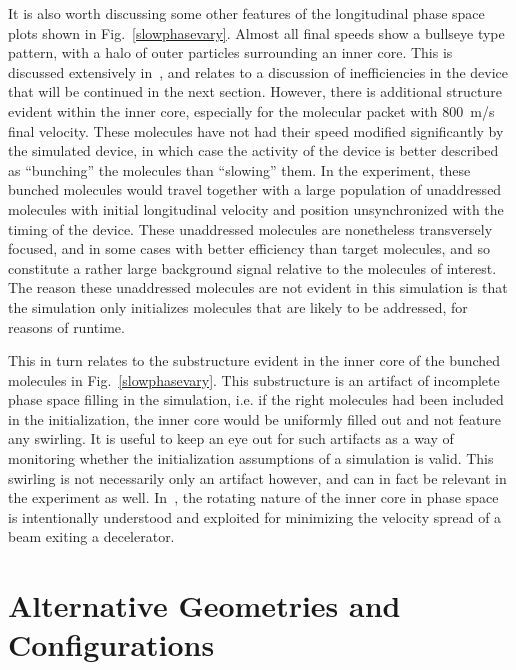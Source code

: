 It is also worth discussing some other features of the longitudinal phase space plots shown in Fig.~\ref{slowphasevary}. 
Almost all final speeds show a bullseye type pattern, with a halo of outer particles surrounding an inner core.
This is discussed extensively in~\cite{VanDeMeerakker2006}, and relates to a discussion of inefficiencies in the device that will be continued in the next section.
However, there is additional structure evident within the inner core, especially for the molecular packet with $800$~m/s final velocity.
These molecules have not had their speed modified significantly by the simulated device, in which case the activity of the device is better described as ``bunching'' the molecules than ``slowing'' them.
In the experiment, these bunched molecules would travel together with a large population of unaddressed molecules with initial longitudinal velocity and position unsynchronized with the timing of the device.
These unaddressed molecules are nonetheless transversely focused, and in some cases with better efficiency than target molecules, and so constitute a rather large background signal relative to the molecules of interest.
The reason these unaddressed molecules are not evident in this simulation is that the simulation only initializes molecules that are likely to be addressed, for reasons of runtime.

This in turn relates to the substructure evident in the inner core of the bunched molecules in Fig.~\ref{slowphasevary}.
This substructure is an artifact of incomplete phase space filling in the simulation, i.e. if the right molecules had been included in the initialization, the inner core would be uniformly filled out and not feature any swirling.
It is useful to keep an eye out for such artifacts as a way of monitoring whether the initialization assumptions of a simulation is valid. 
This swirling is not necessarily only an artifact however, and can in fact be relevant in the experiment as well.
In~\cite{Parazzoli2009}, the rotating nature of the inner core in phase space is intentionally understood and exploited for minimizing the velocity spread of a beam exiting a decelerator.

\section{Alternative Geometries and Configurations}

